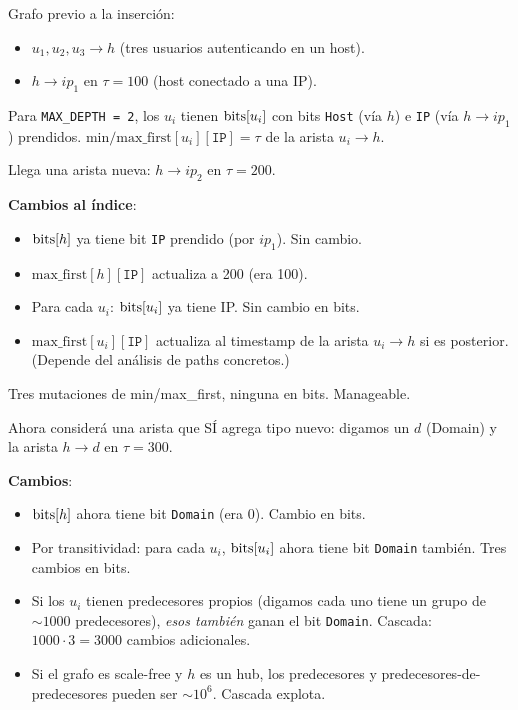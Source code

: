 \begin{ejemplo}
Grafo previo a la inserción:
\begin{itemize}
    \item \(u_1, u_2, u_3 \to h\) (tres usuarios autenticando en un
    host).
    \item \(h \to ip_1\) en \(\tau = 100\) (host conectado a una IP).
\end{itemize}

\noindent
Para \texttt{MAX\_DEPTH = 2}, los \(u_i\) tienen \(\mathrm{bits}[u_i]\)
con bits \texttt{Host} (vía \(h\)) e \texttt{IP} (vía \(h \to
ip_1\)) prendidos. \(\mathrm{min/max\_first}[u_i][\texttt{IP}] =
\tau\) de la arista \(u_i \to h\).

Llega una arista nueva: \(h \to ip_2\) en \(\tau = 200\).

\textbf{Cambios al índice}:
\begin{itemize}
    \item \(\mathrm{bits}[h]\) ya tiene bit \texttt{IP} prendido (por \(ip_1\)).
    Sin cambio.
    \item \(\mathrm{max\_first}[h][\texttt{IP}]\) actualiza a 200
    (era 100).
    \item Para cada \(u_i\): \(\mathrm{bits}[u_i]\) ya tiene IP. Sin cambio
    en bits.
    \item \(\mathrm{max\_first}[u_i][\texttt{IP}]\) actualiza al
    timestamp de la arista \(u_i \to h\) si es posterior. (Depende
    del análisis de paths concretos.)
\end{itemize}

\noindent
Tres mutaciones de min/max\_first, ninguna en bits. Manageable.

Ahora considerá una arista que SÍ agrega tipo nuevo: digamos un
\(d\) (Domain) y la arista \(h \to d\) en \(\tau = 300\).

\textbf{Cambios}:
\begin{itemize}
    \item \(\mathrm{bits}[h]\) ahora tiene bit \texttt{Domain} (era 0).
    Cambio en bits.
    \item Por transitividad: para cada \(u_i\), \(\mathrm{bits}[u_i]\) ahora
    tiene bit \texttt{Domain} también. Tres cambios en bits.
    \item Si los \(u_i\) tienen predecesores propios (digamos cada
    uno tiene un grupo de \(\sim 1000\) predecesores), \emph{esos
    también} ganan el bit \texttt{Domain}. Cascada: \(1000 \cdot 3 =
    3000\) cambios adicionales.
    \item Si el grafo es scale-free y \(h\) es un hub, los
    predecesores y predecesores-de-predecesores pueden ser
    \(\sim 10^6\). Cascada explota.
\end{itemize}
\end{ejemplo}

